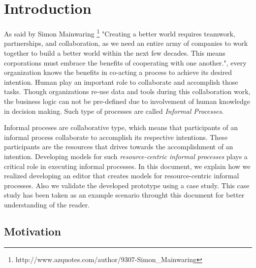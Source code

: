 \chapter{Introduction}
\label{chap:introduction}

As said by Simon Mainwaring  \footnote{http://www.azquotes.com/author/9307-Simon\_Mainwaring}  "Creating a better world requires teamwork, partnerships, and collaboration, as we need an entire army of companies to work together to build a better world within the next few decades. This means corporations must embrace the benefits of cooperating with one another.", every organization knows the benefits in co-acting a process to achieve its desired intention. Human play an important role to collaborate and accomplish those tasks. Though organizations re-use data and tools during this collaboration work, the business logic can not be pre-defined due to involvement of human knowledge in decision making\cite{Sungur2014}. Such type of processes are called \textit{Informal Processes}.

Informal proceses are collaborative type, which means that participants of an informal process collaborate to accomplish its respective intentions. These participants are the resources that drives towards the accomplishment of an intention.  Developing models for such \textit{resource-centric informal processes} plays a critical role in executing informal processes. In this document, we explain how we realized developing an editor that creates models for resource-centric informal processes. Also we validate the developed prototype using a case study. This case study has been taken as an example scenario throught this document for better understanding of the reader.




\section{Motivation}
\label{sec:motivation}

